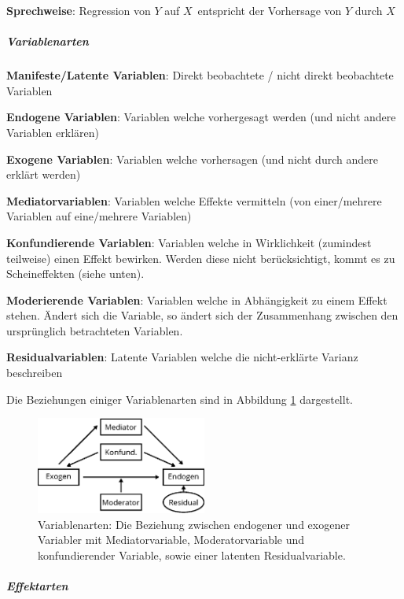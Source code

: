 \documentclass{article}
\numberwithin{equation}{section}
\begin{document}
\textbf{Sprechweise}: \glqq Regression von $Y$ auf $X$\grqq\ entspricht der \glqq Vorhersage von $Y$ durch $X$\grqq

\subparagraph{Variablenarten}

\begin{compactitem}
\item \textbf{Manifeste/Latente Variablen}: Direkt beobachtete / nicht direkt beobachtete Variablen
\item \textbf{Endogene Variablen}: Variablen welche vorhergesagt werden (und nicht andere Variablen erklären)
\item \textbf{Exogene Variablen}: Variablen welche vorhersagen (und nicht durch andere erklärt werden)
\item \textbf{Mediatorvariablen}: Variablen welche Effekte vermitteln (von einer/mehrere Variablen auf eine/mehrere Variablen)
\item \textbf{Konfundierende Variablen}: Variablen welche in Wirklichkeit (zumindest teilweise) einen Effekt bewirken. Werden diese nicht berücksichtigt, kommt es zu Scheineffekten (siehe unten).
\item \textbf{Moderierende Variablen}: Variablen welche in Abhängigkeit zu einem Effekt stehen. Ändert sich die Variable, so ändert sich der Zusammenhang zwischen den ursprünglich betrachteten Variablen.
\item \textbf{Residualvariablen}: Latente Variablen welche die nicht-erklärte Varianz beschreiben
\end{compactitem}

Die Beziehungen einiger Variablenarten sind in Abbildung \ref{img:variablenarten} dargestellt.

\begin{figure}[h]
  \centering
  \includegraphics[width=0.5\textwidth]{images/variablenarten.eps}
  \caption{Variablenarten: Die Beziehung zwischen endogener und exogener Variabler mit Mediatorvariable, Moderatorvariable und konfundierender Variable, sowie einer latenten Residualvariable.}
  \label{img:variablenarten}
\end{figure}

\subparagraph{Effektarten}
\end{document}
